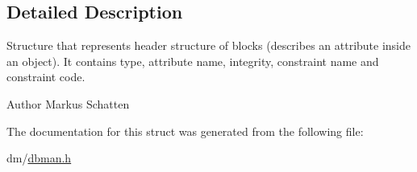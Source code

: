\subsection{Detailed Description}
Structure that represents header structure of blocks (describes an attribute inside an object). It contains type, attribute name, integrity, constraint name and constraint code. 

\begin{DoxyAuthor}{Author}
Markus Schatten 
\end{DoxyAuthor}


The documentation for this struct was generated from the following file\+:\begin{DoxyCompactItemize}
\item 
dm/\hyperlink{dbman_8h}{dbman.\+h}\end{DoxyCompactItemize}
